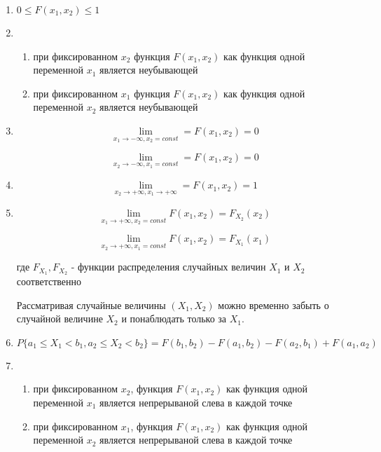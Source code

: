\documentclass[a4paper, 14pt]{report}
\begin{document}
\begin{enumerate}
    \item $0 \le F(x_1, x_2) \le 1$
    \item
        \begin{enumerate}
            \item при фиксированном $x_2$ функция $F(x_1,x_2)$ как функция одной переменной $x_1$ является неубывающей
            \item при фиксированном $x_1$ функция $F(x_1,x_2)$ как функция одной переменной $x_2$ является неубывающей
        \end{enumerate}
    \item 
        $$\lim_{x_1 \to - \infty, x_2 = const} = F(x_1, x_2) = 0$$

        $$\lim_{x_2 \to - \infty, x_1 = const} = F(x_1, x_2) = 0$$

    \item 
        $$\lim_{x_2 \to +\infty, x_1 \to +\infty} = F(x_1, x_2) = 1$$

    \item

        $$
        \lim_{x_1 \to +\infty, x_2 = const} F(x_1, x_2) = F_{X_2} (x_2)
        $$


        $$
        \lim_{x_2 \to +\infty, x_1 = const} F(x_1, x_2) = F_{X_1} (x_1)
        $$

        где $F_{X_1}, F_{X_2}$ - функции распределения случайных величин $X_1$ и $X_2$ соответственно

        Рассматривая случайные величины $(X_1, X_2)$ можно временно забыть о случайной величине $X_2$ и понаблюдать только за $X_1$.

    \item $P\{ a_1 \le X_1 < b_1, a_2 \le X_2 < b_2 \} = F(b_1, b_2) - F(a_1, b_2) - F(a_2, b_1) + F(a_1, a_2)$

    \item 
        \begin{enumerate}
            \item при фиксированном $x_2$, функция $F(x_1,x_2)$ как функция одной переменной $x_1$ является непрерываной слева в каждой точке
            \item при фиксированном $x_1$, функция $F(x_1,x_2)$ как функция одной переменной $x_2$ является непрерываной слева в каждой точке
        \end{enumerate}
\end{enumerate}
\end{document}
